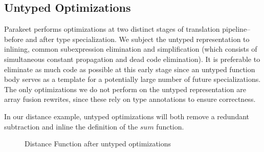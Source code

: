 \documentclass[preprint]{sigplanconf}
\begin{document}
\subsection{Untyped Optimizations}
Parakeet performs optimizations at two distinct stages of translation pipeline-- before and after type specialization. We subject the untyped representation to inlining, common subexpression elimination and simplification (which consists of simultaneous constant propagation and dead code elimination). It is preferable to eliminate as much code as possible at this early stage since an untyped function body serves as a template for a potentially large number of future specializations. The only optimizations we do not perform on the untyped representation are array fusion rewrites, since these rely on type annotations to ensure correctness. 

In our distance example, untyped optimizations will both remove a redundant subtraction and inline the definition of the $sum$ function. 
\begin{figure}[h!]
\caption{Distance Function after untyped optimizations}
\end{figure}
\end{document}

